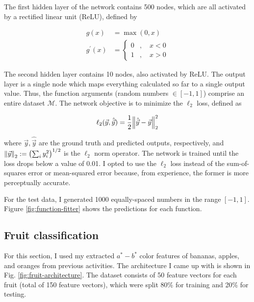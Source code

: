 \documentclass[12pt,a4paper]{article}
\begin{document}
The first hidden layer of the network contains 500 nodes, which are all activated by a rectified linear unit (ReLU), defined by

\begin{align}
	g(x) &= \max(0, x) \label{eq:relu} \\
	g^\prime(x) &=
	\begin{cases}
		0 & , \quad x < 0 \\
		1 & , \quad x > 0
	\end{cases} \label{eq:relu-grad}
\end{align}

\noindent The second hidden layer contains 10 nodes, also activated by ReLU. The output layer is a single node which maps everything calculated so far to a single output value. Thus, the function arguments (random numbers $\in [-1,1]$) comprise an entire dataset $\mathcal{M}$. The network objective is to minimize the $\ell_2$ loss, defined as

\begin{equation}\label{eq:l2-loss}
	\ell_2(\vec{y}, \hat{\vec{y}}) = \frac{1}{2} \norm{\hat{\vec{y}} - \vec{y}}_2^2
\end{equation}

\noindent where $\vec{y}, \hat{\vec{y}}$ are the ground truth and predicted outputs, respectively, and $\norm{\vec{y}}_2 := \qty(\sum_i y_i^2)^{1/2}$ is the $\ell_2$ norm operator. The network is trained until the loss drops below a value of 0.01. I opted to use the $\ell_2$ loss instead of the sum-of-squares error or mean-squared error because, from experience, the former is more perceptually accurate. 

For the test data, I generated 1000 equally-spaced numbers in the range $[-1,1]$. Figure \ref{fig:function-fitter} shows the predictions for each function.

\subsection{Fruit classification}
For this section, I used my extracted $a^*-b^*$ color features of bananas, apples, and oranges from previous activities. The architecture I came up with is shown in Fig. \ref{fig:fruit-architecture}. The dataset consists of 50 feature vectors for each fruit (total of 150 feature vectors), which were split 80\% for training and 20\% for testing. 
\end{document}
